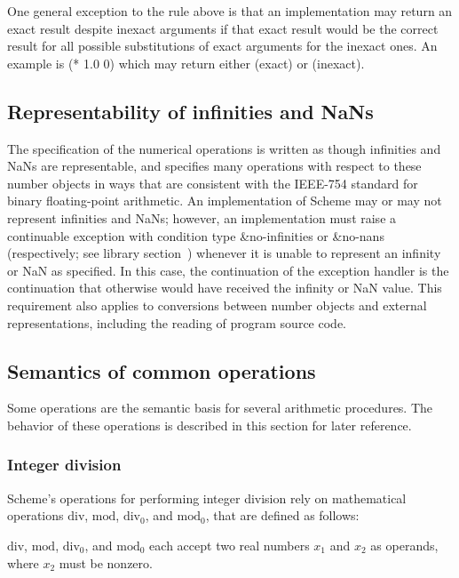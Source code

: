 One general exception to the rule above is that an implementation may
return an exact result despite inexact arguments if that exact result
would be the correct result for all possible substitutions of exact
arguments for the inexact ones.  An example is {\cf (* 1.0 0)} which
may return either {} (exact) or {} (inexact).

\subsection{Representability of infinities and NaNs}
\label{infinitiesnanssection}

The specification of the numerical operations is written as though
infinities and NaNs are representable, and specifies many operations
with respect to these number objects in ways that are consistent with the
IEEE-754 standard for binary floating-point arithmetic.  
An implementation of Scheme may or may not represent infinities and
NaNs; however,
an implementation must raise a continuable exception with
condition type {\cf\&no-infinities} or {\cf\&no-nans} (respectively;
see library section~)
whenever it is unable to represent an infinity or NaN as specified. 
In this case, the continuation of the exception
handler is the continuation that otherwise would have received
the infinity or NaN value.  This requirement also applies to
conversions between number objects and external representations, including
the reading of program source code.

\subsection{Semantics of common operations}

Some operations are the semantic basis for several arithmetic
procedures.  The behavior of these operations is described in this
section for later reference.

\subsubsection{Integer division}
\label{integerdivision}

Scheme's operations for performing integer
division rely on mathematical operations $\mathrm{div}$,
$\mathrm{mod}$, $\mathrm{div}_0$, and
$\mathrm{mod}_0$, that are defined as follows:

$\mathrm{div}$, $\mathrm{mod}$, $\mathrm{div}_0$, and $\mathrm{mod}_0$
each accept two real numbers $x_1$ and $x_2$ as operands, where
$x_2$ must be nonzero.

